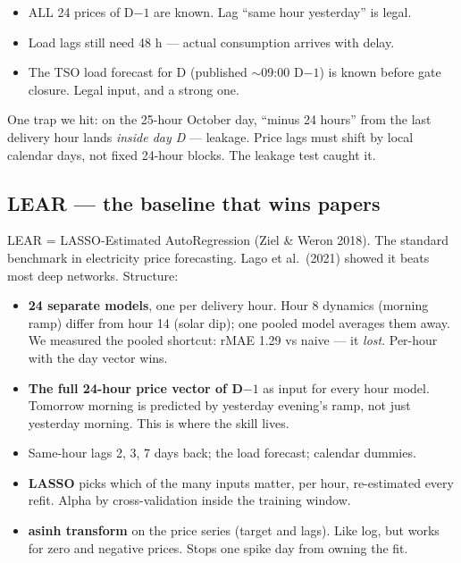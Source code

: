 \begin{itemize}
  \item ALL 24 prices of D$-1$ are known. Lag ``same hour yesterday'' is legal.
  \item Load lags still need 48 h --- actual consumption arrives with delay.
  \item The TSO load forecast for D (published $\sim$09:00 D$-1$) is known
        before gate closure. Legal input, and a strong one.
\end{itemize}

One trap we hit: on the 25-hour October day, ``minus 24 hours'' from the last
delivery hour lands \emph{inside day D} --- leakage. Price lags must shift by
local calendar days, not fixed 24-hour blocks. The leakage test caught it.

\subsection{LEAR --- the baseline that wins papers}

LEAR = LASSO-Estimated AutoRegression (Ziel \& Weron 2018). The standard
benchmark in electricity price forecasting. Lago et al.\ (2021) showed it
beats most deep networks. Structure:

\begin{itemize}
  \item \textbf{24 separate models}, one per delivery hour. Hour 8 dynamics
        (morning ramp) differ from hour 14 (solar dip); one pooled model
        averages them away. We measured the pooled shortcut: rMAE 1.29
        vs naive --- it \emph{lost}. Per-hour with the day vector wins.
  \item \textbf{The full 24-hour price vector of D$-1$} as input for every
        hour model. Tomorrow morning is predicted by yesterday evening's
        ramp, not just yesterday morning. This is where the skill lives.
  \item Same-hour lags 2, 3, 7 days back; the load forecast; calendar dummies.
  \item \textbf{LASSO} picks which of the many inputs matter, per hour,
        re-estimated every refit. Alpha by cross-validation inside the
        training window.
  \item \textbf{asinh transform} on the price series (target and lags).
        Like log, but works for zero and negative prices. Stops one spike
        day from owning the fit.
\end{itemize}

